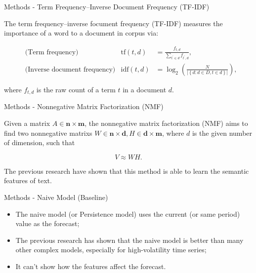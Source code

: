 \documentclass{beamer}
\begin{document}
\begin{frame}{Methods - Term Frequency–Inverse Document Frequency (TF-IDF)}

  The term frequency–inverse focument frequency (TF-IDF)   measures the importance of a word to a document in corpus via: \vspace{.25cm}

  $$
    \begin{aligned}
       & \text{(Term frequency)}             & \mathrm{tf}(t, d)  & = \frac{f_{t, d}}{\sum_{t^\prime \in d} f_{t^\prime, d}},                                     \\
       & \text{(Inverse document frequency)} & \mathrm{idf}(t, d) & = \log_2\left( \frac{N}{\left\vert \left\{ d: d \in D, t \in d \right\} \right\vert} \right),
    \end{aligned}
  $$ \vspace{.25cm}

  where $f_{t, d}$ is the raw count of a term $t$ in a document $d$.

\end{frame}

\begin{frame}{Methods - Nonnegative Matrix Factorization (NMF)}

  Given a matrix $A \in \mathbf{n \times m}$, the nonnegative matrix factorization (NMF)  aims to find two nonnegative matrixs $W \in \mathbf{n \times d}, H \in \mathbf{d \times m}$, where $d$ is the given number of dimension, such that \vspace{.25cm}

  $$
    V \approx W H.
  $$ \vspace{.25cm}

  The previous research  have shown that this method is able to learn the semantic features of text.

\end{frame}

\begin{frame}{Methods - Naive Model (Baseline)}

  \begin{itemize}
    \item The naive model (or Persistence model) uses the current (or same period) value as the forecast; \vspace{.25cm}
    \item The previous research  has shown that the naive model is better than many other complex models, especially for high-volatility time series; \vspace{.25cm}
    \item It can't show how the features affect the forecast.
  \end{itemize}

\end{frame}
\end{document}

